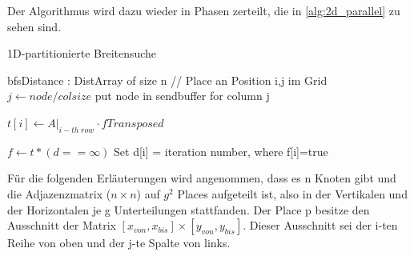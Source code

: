  Der Algorithmus wird dazu wieder in Phasen zerteilt, die in \ref{alg:2d_parallel} zu sehen sind.

 \begin{algorithm}[h]
	\caption{1D-partitionierte Breitensuche}
	\label{alg:2d_parallel}
	\begin{algorithmic}[1]
		\State bfsDistance : DistArray of size n 
			\State // Place an Position i,j im Grid
					\State $j \gets \mathit{node} / \mathit{colsize} $
					\State put node in sendbuffer for column j
				\EndFor

					\State $t[i] \gets A\big|_{i-th\;row} \cdot \mathit{fTransposed}$
				\EndFor

				\EndFor

				\State $f \gets t * (d==\infty)$
				\State Set d[i] = iteration number, where f[i]=true
			\EndWhile
		\EndFor
	\end{algorithmic}
\end{algorithm}
Für die folgenden Erläuterungen wird angenommen, dass es n Knoten gibt und die Adjazenzmatrix ($n \times n$) auf $g^2$ Places aufgeteilt ist, also in der Vertikalen und der Horizontalen je g Unterteilungen stattfanden. Der Place p besitze den Ausschnitt der Matrix $\left[x_{von}, x_{bis} \right] \times \left[y_{von}, y_{bis} \right]$. Dieser Ausschnitt sei der i-ten Reihe von oben und der j-te Spalte von links. 


